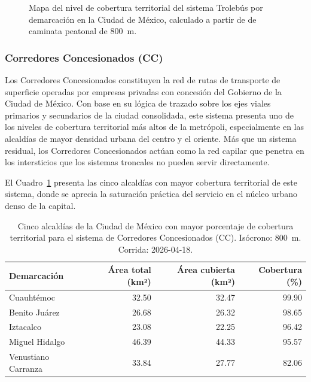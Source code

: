 \begin{figure}[H]
    \centering
    \caption[Mapa de cobertura territorial del Trolebús en la CDMX]{Mapa del
    nivel de cobertura territorial del sistema Trolebús por demarcación en la
    Ciudad de México, calculado a partir de  de caminata
    peatonal de 800~m.}
    \label{fig:mapa-cobertura-trole}
\end{figure}

\subsubsection{Corredores Concesionados (CC)}
\label{subsubsec:cobertura-cc}

Los Corredores Concesionados constituyen la red de rutas de transporte de
superficie operadas por empresas privadas con concesión del Gobierno de la Ciudad
de México. Con base en su lógica de trazado sobre los ejes viales primarios y
secundarios de la ciudad consolidada, este sistema presenta uno de los niveles de
cobertura territorial más altos de la metrópoli, especialmente en las alcaldías de
mayor densidad urbana del centro y el oriente. Más que un sistema residual, los
Corredores Concesionados actúan como la red capilar que penetra en los intersticios
que los sistemas troncales no pueden servir directamente.

El Cuadro~\ref{tab:cobertura-cc-cdmx} presenta las cinco alcaldías con mayor
cobertura territorial de este sistema, donde se aprecia la saturación práctica del
servicio en el núcleo urbano denso de la capital.

\begin{table}[H]
    \centering
    \caption[Alcaldías con mayor cobertura de Corredores Concesionados (CDMX)]{
    Cinco alcaldías de la Ciudad de México con mayor porcentaje de cobertura
    territorial para el sistema de Corredores Concesionados (CC). Isócrono: 800~m.
    Corrida: 2026-04-18.}
    \label{tab:cobertura-cc-cdmx}
    \begin{tabular}{|l|r|r|r|}
        \hline
        \textbf{Demarcación} & \textbf{Área total (km²)} & \textbf{Área cubierta (km²)} & \textbf{Cobertura (\%)} \\
        \hline
        Cuauhtémoc          & 32.50 & 32.47 &  99.90 \\
        Benito Juárez       & 26.68 & 26.32 &  98.65 \\
        Iztacalco           & 23.08 & 22.25 &  96.42 \\
        Miguel Hidalgo      & 46.39 & 44.33 &  95.57 \\
        Venustiano Carranza & 33.84 & 27.77 &  82.06 \\
        \hline
    \end{tabular}
\end{table}

